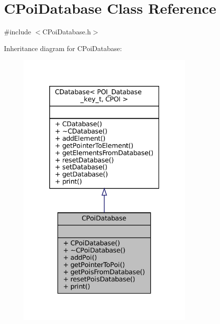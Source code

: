 \hypertarget{classCPoiDatabase}{}\section{C\+Poi\+Database Class Reference}
\label{classCPoiDatabase}


{\ttfamily \#include $<$C\+Poi\+Database.\+h$>$}



Inheritance diagram for C\+Poi\+Database\+:
\nopagebreak
\begin{figure}[H]
\begin{center}
\leavevmode
\includegraphics[width=247pt]{classCPoiDatabase__inherit__graph}
\end{center}
\end{figure}


